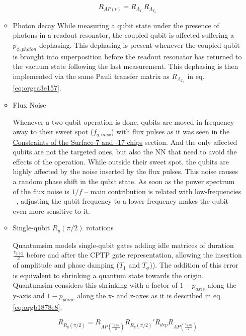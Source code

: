 \begin{itemize}
\begin{itemize}
\begin{equation}
\label{eq:orgca3e157}
R_{AP (t)} = R_{\Lambda_{T_1}} R_{\Lambda_{T_{\phi}}}
\end{equation}

\item Photon decay
\label{sec:org0c87b2b}
While measuring a qubit state under the presence of photons in a readout resonator, the coupled qubit is affected suffering a \(p_{\phi, photon}\) dephasing.
This dephasing is present whenever the coupled qubit is brought into superposition before the readout resonator has returned to the vacuum state following the last measurement.
This dephasing is then implemented via the same Pauli transfer matrix as \(R_{\Lambda_{T_{\phi}}}\) in eq. \ref{eq:orgca3e157}.

\item Flux Noise
\label{sec:orgc85d4d8}

Whenever a two-qubit operation is done, qubits are moved in frequency away to their sweet spot (\(f_{q,max}\)) with flux pulses as it was seen in the \href{chapter-3.org}{Constraints of the Surface-7 and -17 chips} section.
And the only affected qubits are not the targeted ones, but also the NN that need to avoid the effects of the operation.
While outside their sweet spot, the qubits are highly affected by the noise inserted by the flux pulses.
This noise causes a random phase shift in the qubit state.
As soon as the power spectrum of the flux noise is \(1/f\) -- main contribution is related with low-frequencies --, adjusting the qubit frequency to a lower frequency makes the qubit even more sensitive to it.

\item Single-qubit \(R_y(\pi /2)\) rotations
\label{sec:org3d28bcc}

Quantumsim models single-qubit gates adding idle matrices of duration \(\frac{\tau_{g,1Q}}{2}\) before and after the CPTP gate representation, allowing the insertion of amplitude and phase damping (\(T_1\) and \(T_{\phi}\))).
The addition of this error is equivalent to shrinking a quantum state towards the origin.
Quantumsim considers this shrinking with a factor of \(1 - p_{axis}\) along the y-axis and \(1 - p_{plane}\) along the x- and z-axes as it is described in eq. \ref{eq:orgb1878e8}.

\begin{equation}
\label{eq:orgb1878e8}
R_{R_y (\pi /2)} = R_{AP (\frac{\tau_{g,1Q}}{2})} R_{R_y (\pi /2)}' R_{dep} R_{AP (\frac{\tau_{g,1Q}}{2})}
\end{equation}


\end{itemize}
\end{itemize}
